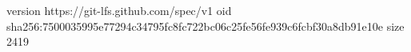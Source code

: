 version https://git-lfs.github.com/spec/v1
oid sha256:7500035995e77294c34795fc8fc722bc06c25fe56fe939c6fcbf30a8db91e10e
size 2419
